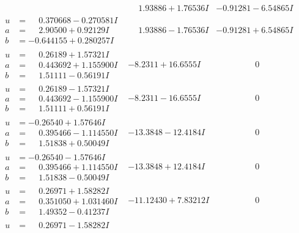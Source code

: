 \documentclass[1p]{elsarticle_modified}
\theoremstyle{definition}
\begin{document}
$$\begin{array}{c|c|c}
 & \phantom{-}1.93886 + 1.76536 I & -0.91281 - 6.54865 I \\ \hline\begin{aligned}
u &= \phantom{-}0.370668 - 0.270581 I \\
a &= \phantom{-}2.90500 + 0.92129 I \\
b &= -0.644155 + 0.280257 I\end{aligned}
 & \phantom{-}1.93886 - 1.76536 I & -0.91281 + 6.54865 I \\ \hline\begin{aligned}
u &= \phantom{-}0.26189 + 1.57321 I \\
a &= \phantom{-}0.443692 + 1.155900 I \\
b &= \phantom{-}1.51111 - 0.56191 I\end{aligned}
 & -8.2311 + 16.6555 I & \phantom{-0.000000 } 0 \\ \hline\begin{aligned}
u &= \phantom{-}0.26189 - 1.57321 I \\
a &= \phantom{-}0.443692 - 1.155900 I \\
b &= \phantom{-}1.51111 + 0.56191 I\end{aligned}
 & -8.2311 - 16.6555 I & \phantom{-0.000000 } 0 \\ \hline\begin{aligned}
u &= -0.26540 + 1.57646 I \\
a &= \phantom{-}0.395466 - 1.114550 I \\
b &= \phantom{-}1.51838 + 0.50049 I\end{aligned}
 & -13.3848 - 12.4184 I & \phantom{-0.000000 } 0 \\ \hline\begin{aligned}
u &= -0.26540 - 1.57646 I \\
a &= \phantom{-}0.395466 + 1.114550 I \\
b &= \phantom{-}1.51838 - 0.50049 I\end{aligned}
 & -13.3848 + 12.4184 I & \phantom{-0.000000 } 0 \\ \hline\begin{aligned}
u &= \phantom{-}0.26971 + 1.58282 I \\
a &= \phantom{-}0.351050 + 1.031460 I \\
b &= \phantom{-}1.49352 - 0.41237 I\end{aligned}
 & -11.12430 + 7.83212 I & \phantom{-0.000000 } 0 \\ \hline\begin{aligned}
u &= \phantom{-}0.26971 - 1.58282 I \\

\end{aligned}
\end{array}$$
\end{document}
